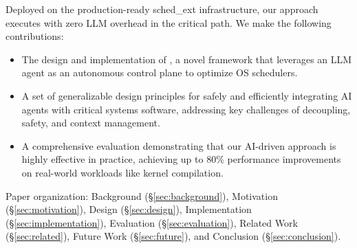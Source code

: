 Deployed on the production-ready sched\_ext infrastructure, our approach executes with zero LLM overhead in the critical path. We make the following contributions:
\begin{itemize}
    \item The design and implementation of \sys, a novel framework that leverages an LLM agent as an autonomous control plane to optimize OS schedulers.
    \item A set of generalizable design principles for safely and efficiently integrating AI agents with critical systems software, addressing key challenges of decoupling, safety, and context management.
    \item A comprehensive evaluation demonstrating that our AI-driven approach is highly effective in practice, achieving up to 80\% performance improvements on real-world workloads like kernel compilation.
\end{itemize}

Paper organization: Background (§\ref{sec:background}), Motivation (§\ref{sec:motivation}), Design (§\ref{sec:design}), Implementation (§\ref{sec:implementation}), Evaluation (§\ref{sec:evaluation}), Related Work (§\ref{sec:related}), Future Work (§\ref{sec:future}), and Conclusion (§\ref{sec:conclusion}).


